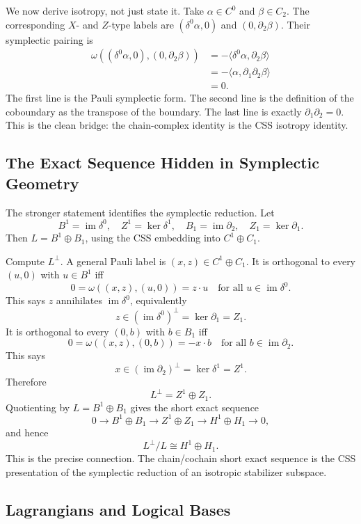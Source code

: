 We now derive isotropy, not just state it. Take \(\alpha\in C^0\) and
\(\beta\in C_2\). The corresponding \(X\)- and \(Z\)-type labels are
\((\delta^0\alpha,0)\) and \((0,\partial_2\beta)\). Their symplectic pairing is
\[
\begin{aligned}
  \omega((\delta^0\alpha,0),(0,\partial_2\beta))
  &=-\langle \delta^0\alpha,\partial_2\beta\rangle       \\
  &=-\langle \alpha,\partial_1\partial_2\beta\rangle      \\
  &=0 .
\end{aligned}
\]
The first line is the Pauli symplectic form. The second line is the definition
of the coboundary as the transpose of the boundary. The last line is exactly
\(\partial_1\partial_2=0\). This is the clean bridge: the chain-complex
identity is the CSS isotropy identity.

\subsection{The Exact Sequence Hidden in Symplectic Geometry}

The stronger statement identifies the symplectic reduction. Let
\[
  B^1=\operatorname{im}\delta^0,\quad
  Z^1=\ker\delta^1,\quad
  B_1=\operatorname{im}\partial_2,\quad
  Z_1=\ker\partial_1.
\]
Then \(L=B^1\oplus B_1\), using the CSS embedding into \(C^1\oplus C_1\).

Compute \(L^\perp\). A general Pauli label is \((x,z)\in C^1\oplus C_1\). It
is orthogonal to every \((u,0)\) with \(u\in B^1\) iff
\[
  0=\omega((x,z),(u,0))=z\cdot u
  \quad\text{for all }u\in \operatorname{im}\delta^0.
\]
This says \(z\) annihilates \(\operatorname{im}\delta^0\), equivalently
\[
  z\in(\operatorname{im}\delta^0)^\perp
  =\ker\partial_1=Z_1 .
\]
It is orthogonal to every \((0,b)\) with \(b\in B_1\) iff
\[
  0=\omega((x,z),(0,b))=-x\cdot b
  \quad\text{for all }b\in \operatorname{im}\partial_2.
\]
This says
\[
  x\in(\operatorname{im}\partial_2)^\perp
  =\ker\delta^1=Z^1 .
\]
Therefore
\[
  L^\perp=Z^1\oplus Z_1 .
\]
Quotienting by \(L=B^1\oplus B_1\) gives the short exact sequence
\[
  0\longrightarrow B^1\oplus B_1
  \longrightarrow Z^1\oplus Z_1
  \longrightarrow H^1\oplus H_1
  \longrightarrow 0,
\]
and hence
\[
  L^\perp/L\cong H^1\oplus H_1.
\]
This is the precise connection. The chain/cochain short exact sequence is the
CSS presentation of the symplectic reduction of an isotropic stabilizer
subspace.

\subsection{Lagrangians and Logical Bases}

